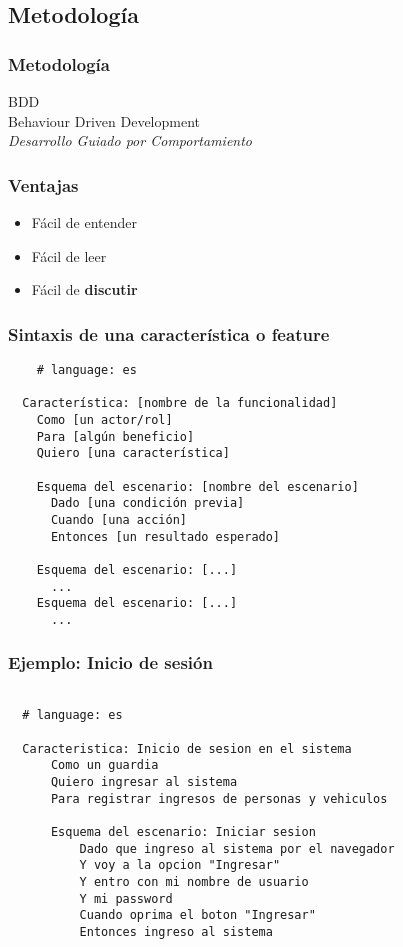 \documentclass{beamer}
\begin{document}
\begin{frame}
  \section{Metodolog\'ia}
  \frametitle{Metodolog\'ia}
  \begin{center}
    {\huge BDD} \\
    Behaviour Driven Development \\
    \vspace{1cm}
    {\it Desarrollo Guiado por Comportamiento}
  \end{center}
\end{frame}

\begin{frame}
  \frametitle{Ventajas}
  \begin{itemize}
    \item Fácil de entender
    \item Fácil de leer
    \item Fácil de {\bfseries discutir}
  \end{itemize}
\end{frame}

\begin{frame}[fragile]
  \frametitle{Sintaxis de una característica o feature}
  \begin{verbatim}
    # language: es

  Característica: [nombre de la funcionalidad]
    Como [un actor/rol]
    Para [algún beneficio]
    Quiero [una característica]

    Esquema del escenario: [nombre del escenario]
      Dado [una condición previa]
      Cuando [una acción]
      Entonces [un resultado esperado]

    Esquema del escenario: [...]
      ...
    Esquema del escenario: [...]
      ...
  \end{verbatim}
\end{frame}

\begin{frame}[fragile]
  \frametitle{Ejemplo: Inicio de sesión}
  \begin{verbatim}

  # language: es

  Caracteristica: Inicio de sesion en el sistema
      Como un guardia
      Quiero ingresar al sistema
      Para registrar ingresos de personas y vehiculos

      Esquema del escenario: Iniciar sesion
          Dado que ingreso al sistema por el navegador
          Y voy a la opcion "Ingresar"
          Y entro con mi nombre de usuario
          Y mi password
          Cuando oprima el boton "Ingresar"
          Entonces ingreso al sistema
  \end{verbatim}
\end{frame}
\end{document}
